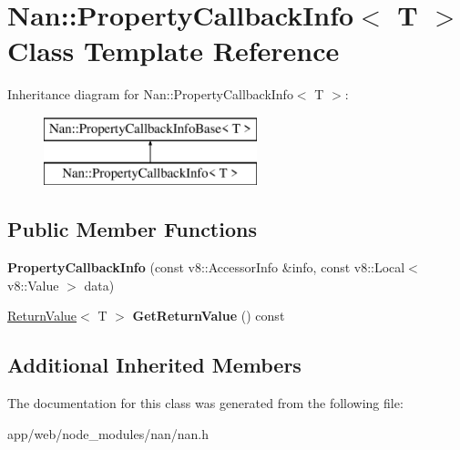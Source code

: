 \hypertarget{class_nan_1_1_property_callback_info}{}\section{Nan\+:\+:Property\+Callback\+Info$<$ T $>$ Class Template Reference}
\label{class_nan_1_1_property_callback_info}
Inheritance diagram for Nan\+:\+:Property\+Callback\+Info$<$ T $>$\+:\begin{figure}[H]
\begin{center}
\leavevmode
\includegraphics[height=2.000000cm]{class_nan_1_1_property_callback_info}
\end{center}
\end{figure}
\subsection*{Public Member Functions}
\begin{DoxyCompactItemize}
\item 
\mbox{\label{class_nan_1_1_property_callback_info_a2b764b8eeea60522ee1bfba6abecb676}} 
{\bfseries Property\+Callback\+Info} (const v8\+::\+Accessor\+Info \&info, const v8\+::\+Local$<$ v8\+::\+Value $>$ data)
\item 
\mbox{\label{class_nan_1_1_property_callback_info_afaca6d1ad8fc07f486ed0b6fcb2512bd}} 
\hyperlink{class_nan_1_1_return_value}{Return\+Value}$<$ T $>$ {\bfseries Get\+Return\+Value} () const
\end{DoxyCompactItemize}
\subsection*{Additional Inherited Members}


The documentation for this class was generated from the following file\+:\begin{DoxyCompactItemize}
\item 
app/web/node\+\_\+modules/nan/nan.\+h\end{DoxyCompactItemize}

